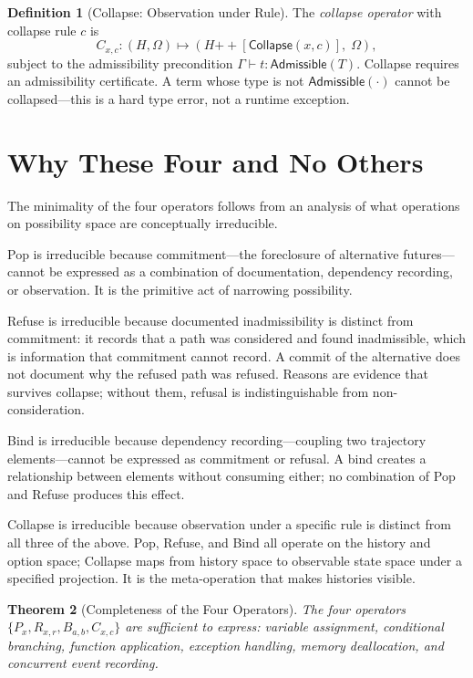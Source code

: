 \documentclass[12pt, a4paper, openany]{book}
\theoremstyle{plain}
\newtheorem{theorem}{Theorem}[chapter]
\theoremstyle{definition}
\newtheorem{definition}[theorem]{Definition}
\theoremstyle{remark}
\newcommand{\Collapse}{\mathsf{Collapse}}
\newcommand{\Adm}{\mathsf{Admissible}}
\begin{document}
\begin{definition}[Collapse: Observation under Rule]
The \emph{collapse operator} with collapse rule $c$ is
\[
C_{x,c} : (H, \Omega) \mapsto (H \mathbin{++} [\Collapse(x, c)],\; \Omega),
\]
subject to the admissibility precondition $\Gamma \vdash t : \Adm(T)$.
Collapse requires an admissibility certificate. A term whose type is not
$\Adm(\cdot)$ cannot be collapsed---this is a hard type error, not a runtime
exception.
\end{definition}

\section{Why These Four and No Others}

The minimality of the four operators follows from an analysis of what operations
on possibility space are conceptually irreducible.

Pop is irreducible because commitment---the foreclosure of alternative
futures---cannot be expressed as a combination of documentation, dependency
recording, or observation. It is the primitive act of narrowing possibility.

Refuse is irreducible because documented inadmissibility is distinct from
commitment: it records that a path was considered and found inadmissible, which
is information that commitment cannot record. A commit of the alternative does not
document why the refused path was refused. Reasons are evidence that survives
collapse; without them, refusal is indistinguishable from non-consideration.

Bind is irreducible because dependency recording---coupling two trajectory
elements---cannot be expressed as commitment or refusal. A bind creates a
relationship between elements without consuming either; no combination of Pop
and Refuse produces this effect.

Collapse is irreducible because observation under a specific rule is distinct from
all three of the above. Pop, Refuse, and Bind all operate on the history and
option space; Collapse maps from history space to observable state space under
a specified projection. It is the meta-operation that makes histories visible.

\begin{theorem}[Completeness of the Four Operators]
\label{thm:completeness}
The four operators $\{P_x, R_{x,r}, B_{a,b}, C_{x,c}\}$ are sufficient to express:
variable assignment, conditional branching, function application, exception
handling, memory deallocation, and concurrent event recording.
\end{theorem}
\end{document}
